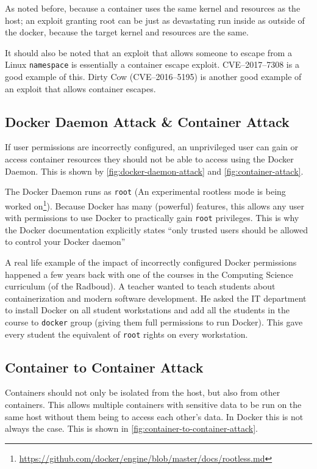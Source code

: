 \hfill

As noted before, because a container uses the same kernel and resources as the host; an exploit granting root can be just as devastating run inside as outside of the docker, because the target kernel and resources are the same.

It should also be noted that an exploit that allows someone to escape from a Linux \lstinline{namespace} is essentially a container escape exploit. CVE--2017--7308\cite{CVE-2017-7308} is a good example of this. Dirty Cow (CVE--2016--5195)\cite{CVE-2016-5195} is another good example of an exploit that allows container escapes\cite{Dirty-Cow-Escape}.

\subsection{Docker Daemon Attack \& Container Attack}
If user permissions are incorrectly configured, an unprivileged user can gain or access container resources they should not be able to access using the Docker Daemon. This is shown by \autoref{fig:docker-daemon-attack} and \autoref{fig:container-attack}.

\hfill

The Docker Daemon runs as \lstinline{root} (An experimental rootless mode is being worked on\footnote{\url{https://github.com/docker/engine/blob/master/docs/rootless.md}}). Because Docker has many (powerful) features, this allows any user with permissions to use Docker to practically gain \lstinline{root} privileges. This is why the Docker documentation explicitly states ``only trusted users should be allowed to control your Docker daemon''\cite{Docker-Daemon-Attack-Surface}

\hfill

A real life example of the impact of incorrectly configured Docker permissions happened a few years back with one of the courses in the Computing Science curriculum (of the Radboud). A teacher wanted to teach students about containerization and modern software development. He asked the IT department to install Docker on all student workstations and add all the students in the course to \lstinline{docker} group (giving them full permissions to run Docker). This gave every student the equivalent of \lstinline{root} rights on every workstation.

\subsection{Container to Container Attack}
Containers should not only be isolated from the host, but also from other containers. This allows multiple containers with sensitive data to be run on the same host without them being to access each other's data. In Docker this is not always the case. This is shown in \autoref{fig:container-to-container-attack}.

